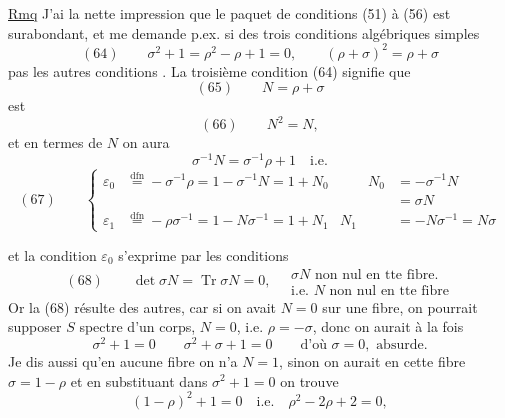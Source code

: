 \uline{Rmq} J'ai la nette impression que le paquet de conditions (51) à (56) est surabondant, et me demande p.ex. si  des trois conditions algébriques simples
\[
(64)\qquad \sigma^2+1=\rho^2-\rho+1=0,\qquad (\rho+\sigma)^2=\rho+\sigma
\]
 pas les autres conditions . La troisième condition (64) signifie que
\[
(65)\qquad N=\rho+\sigma
\]
est 
\[
(66)\qquad N^2=N,
\]
et en termes de $N$ on aura
\[
\sigma^{-1}N=\sigma^{-1}\rho+1\quad\text{i.e.}
\]
\[
(67)\qquad
\left\{\begin{aligned}
\varepsilon_0&\overset{\mathrm{dfn}}{=}-\sigma^{-1}\rho=1-\sigma^{-1}N=1+N_0
&\qquad N_0&=-\sigma^{-1}N\\[-2pt]
&&&=\sigma N\\
\varepsilon_1&\overset{\mathrm{dfn}}{=}-\rho\sigma^{-1}=1-N\sigma^{-1}=1+N_1
& N_1&=-N\sigma^{-1}=N\sigma
\end{aligned}\right.
\]

et la condition $\varepsilon_0$   s'exprime par les conditions
\[
(68)\qquad \det\sigma N=\operatorname{Tr}\sigma N=0,\quad
\begin{gathered}
\sigma N\text{ non nul en tte fibre.}\\
\text{i.e. }N\text{ non nul en tte fibre}
\end{gathered}
\]
Or la   (68) résulte des autres, car si on avait $N=0$ sur une fibre, on pourrait supposer $S$ spectre d'un corps, $N=0$, i.e. $\rho=-\sigma$, donc  on aurait à la fois
\[
\sigma^2+1=0\qquad \sigma^2+\sigma+1=0
\qquad\text{d'où }\sigma=0,\text{ absurde.}
\]
Je dis aussi qu'en aucune fibre on n'a $N=1$, sinon on aurait en cette fibre  $\sigma=1-\rho$ et en substituant dans $\sigma^2+1=0$ on trouve 
\[
(1-\rho)^2+1=0\quad\text{i.e.}\quad \rho^2-2\rho+2=0,
\]


